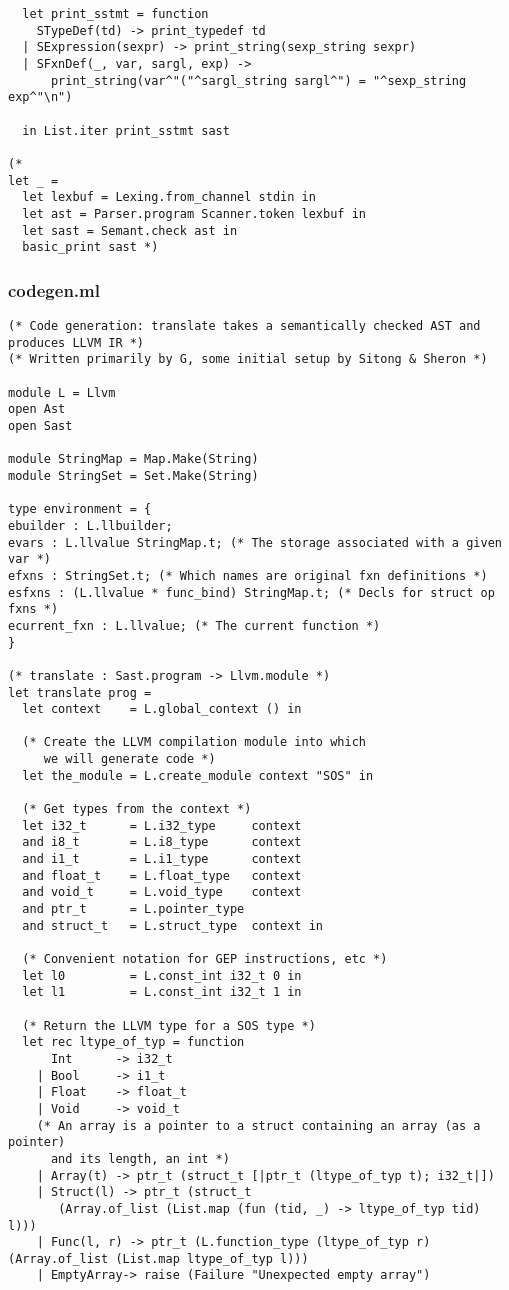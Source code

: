 \documentclass[main.tex]{subfiles}
\begin{document}
\begin{lstlisting}
  let print_sstmt = function
    STypeDef(td) -> print_typedef td
  | SExpression(sexpr) -> print_string(sexp_string sexpr)
  | SFxnDef(_, var, sargl, exp) ->
      print_string(var^"("^sargl_string sargl^") = "^sexp_string exp^"\n")

  in List.iter print_sstmt sast

(*
let _ =
  let lexbuf = Lexing.from_channel stdin in
  let ast = Parser.program Scanner.token lexbuf in
  let sast = Semant.check ast in 
  basic_print sast *)
\end{lstlisting}

\subsubsection{codegen.ml}
\begin{lstlisting}
(* Code generation: translate takes a semantically checked AST and
produces LLVM IR *)
(* Written primarily by G, some initial setup by Sitong & Sheron *)

module L = Llvm
open Ast
open Sast 

module StringMap = Map.Make(String)
module StringSet = Set.Make(String)

type environment = {
ebuilder : L.llbuilder;
evars : L.llvalue StringMap.t; (* The storage associated with a given var *)
efxns : StringSet.t; (* Which names are original fxn definitions *)
esfxns : (L.llvalue * func_bind) StringMap.t; (* Decls for struct op fxns *)
ecurrent_fxn : L.llvalue; (* The current function *)
}

(* translate : Sast.program -> Llvm.module *)
let translate prog =
  let context    = L.global_context () in
  
  (* Create the LLVM compilation module into which
     we will generate code *)
  let the_module = L.create_module context "SOS" in

  (* Get types from the context *)
  let i32_t      = L.i32_type     context
  and i8_t       = L.i8_type      context
  and i1_t       = L.i1_type      context
  and float_t    = L.float_type   context
  and void_t     = L.void_type    context 
  and ptr_t      = L.pointer_type 
  and struct_t   = L.struct_type  context in

  (* Convenient notation for GEP instructions, etc *)
  let l0         = L.const_int i32_t 0 in
  let l1         = L.const_int i32_t 1 in

  (* Return the LLVM type for a SOS type *)
  let rec ltype_of_typ = function
      Int      -> i32_t
    | Bool     -> i1_t
    | Float    -> float_t
    | Void     -> void_t
    (* An array is a pointer to a struct containing an array (as a pointer)
      and its length, an int *)
    | Array(t) -> ptr_t (struct_t [|ptr_t (ltype_of_typ t); i32_t|])
    | Struct(l) -> ptr_t (struct_t
       (Array.of_list (List.map (fun (tid, _) -> ltype_of_typ tid) l)))
    | Func(l, r) -> ptr_t (L.function_type (ltype_of_typ r) (Array.of_list (List.map ltype_of_typ l)))
    | EmptyArray-> raise (Failure "Unexpected empty array")


\end{lstlisting}
\end{document}
